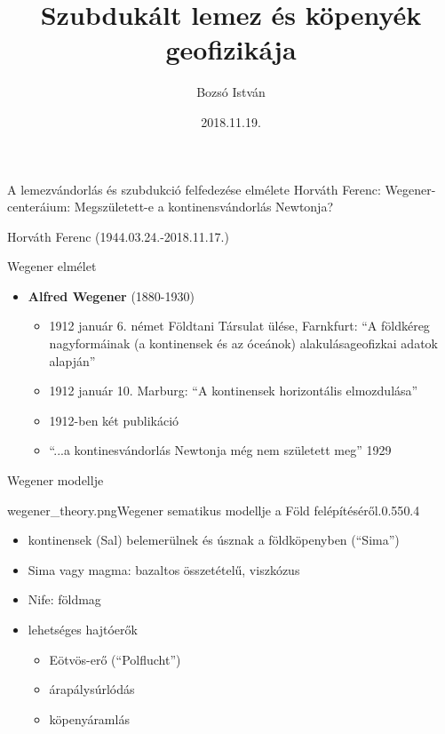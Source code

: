\documentclass{beamer}
\title[Szubdukált lemez geofizikája]{Szubdukált lemez és köpenyék geofizikája}
\author{Bozsó István}
\institute[MTA CSFK GGI]{MTA CSFK Geodéziai és Geofzikai Intézet}
\date{2018.11.19.}
\begin{document}
\begin{frame}
    \titlepage
\end{frame}


\begin{frame}{A lemezvándorlás és szubdukció felfedezése elmélete}
    Horváth Ferenc: Wegener-centeráium: Megszületett-e a kontinensvándorlás Newtonja? \cite{horvath}
    \vspace{10pt}
    
    \pause
    
    \begin{center}
    \begin{minipage}[c]{0.625\textwidth}
        \centering
        
        Horváth Ferenc (1944.03.24.-2018.11.17.)
    \end{minipage}
    \end{center}
\end{frame}


\begin{frame}{Wegener elmélet}
    \begin{itemize}
        \item \textbf{Alfred Wegener} (1880-1930)
        \begin{itemize}
            \item 1912 január 6. német Földtani Társulat ülése, Farnkfurt: ``A földkéreg nagyformáinak (a kontinensek és az óceánok) alakulásageofizkai adatok alapján''
            \item 1912 január 10. Marburg: ``A kontinensek horizontális elmozdulása''
            \item 1912-ben két publikáció
            \item ``...a kontinesvándorlás Newtonja még nem született meg'' 1929
        \end{itemize}
    \end{itemize}
\end{frame}


\begin{frame}{Wegener modellje}
    \begin{figp}{wegener_theory.png}{Wegener sematikus modellje a Föld felépítéséről.}{0.55}{0.4}
        \begin{itemize}
            \item kontinensek (Sal) belemerülnek és úsznak a földköpenyben (``Sima'')
            \item Sima vagy magma: bazaltos összetételű, viszkózus
            \item Nife: földmag
            \item lehetséges hajtóerők
            \begin{itemize}
                \item Eötvös-erő (``Polflucht'')
                \item árapálysúrlódás
                \item köpenyáramlás
            \end{itemize}
        \end{itemize}
    \end{figp}
\end{frame}
\end{document}
